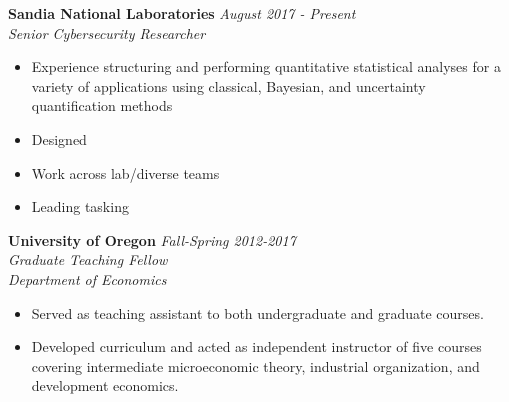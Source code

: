 \documentclass[11pt]{article}
\newenvironment{changemargin}[2]{%
  \begin{list}{}{%
    \setlength{\topsep}{0pt}%
    \setlength{\leftmargin}{#1}%
    \setlength{\rightmargin}{#2}%
    \setlength{\listparindent}{\parindent}%
    \setlength{\itemindent}{\parindent}%
    \setlength{\parsep}{\parskip}%
  }%
  \item[]}{\end{list}
}
\newenvironment{body} {
	\vspace*{-16pt}
	\begin{changemargin}{-0.25in}{-0.5in}
  }	
	{\end{changemargin}
}
\begin{document}
\begin{body}
	\vspace{14pt}
	
	\textbf{Sandia National Laboratories} \hfill \emph{August 2017 - Present}\\
	\emph{Senior Cybersecurity Researcher}\\
	\vspace*{-4pt}
	\begin{itemize}
		\item Experience structuring and performing quantitative statistical analyses for a variety of applications using classical, Bayesian, and uncertainty quantification methods
		\item Designed 
		\item Work across lab/diverse teams
		\item Leading tasking
	\end{itemize}	
	
	
	\textbf{University of Oregon} \hfill \emph{Fall-Spring 2012-2017}\\
	\emph{Graduate Teaching Fellow}\\
	\emph{Department of Economics}
	\vspace*{-4pt}
	\begin{itemize}
		\item Served as teaching assistant to both undergraduate and graduate courses.
		\item Developed curriculum and acted as independent instructor of five courses covering intermediate microeconomic theory, industrial organization, and development economics.
	\end{itemize}	
				
\end{body}
\vspace{-9pt}
\smallskip
\end{document}
